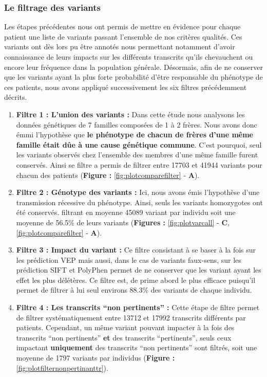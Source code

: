\documentclass[12pt,twoside]{reedthesis}
\theoremstyle{definition}
\theoremstyle{definition}
\theoremstyle{remark}
\begin{document}
  \subsubsection{Le filtrage des
  variants}\label{le-filtrage-des-variants-2}
  
  Les étapes précédentes nous ont permis de mettre en évidence pour chaque
  patient une liste de variants passant l'ensemble de nos critères
  qualités. Ces variants ont dès lors pu être annotés nous permettant
  notamment d'avoir connaissance de leurs impacts sur les différents
  transcrits qu'ils chevauchent ou encore leur fréquence dans la
  population générale. Désormais, afin de ne conserver que les variants
  ayant la plus forte probabilité d'être responsable du phénotype de ces
  patients, nous avons appliqué successivement les six filtres
  précédemment décrits.
  
  \begin{enumerate}
  \def\labelenumi{\arabic{enumi}.}
  \item
    \textbf{Filtre 1 : L'union des variants :} Dans cette étude nous
    analysons les données génétiques de 7 familles composées de 1 à 2
    frères. Nous avons donc émmi l'hypothèse que \textbf{le phénotype de
    chacun de frères d'une même famille était dûe à une cause génétique
    commune}. C'est pourquoi, seul les variants observés chez l'ensemble
    des membres d'une même famille furent conservés. Ainsi se filtre a
    permis de filtrer entre 17703 et 41944 variants pour chacun des
    patients (\textbf{Figure : }\ref{fig:plotcomparefilter} - \textbf{A}).
  \item
    \textbf{Filtre 2 : Génotype des variants :} Ici, nous avons émis
    l'hypothèse d'une transmission récessive du phénotype. Ainsi, seuls
    les variants homozygotes ont été conservés. filtrant en moyenne 45089
    variant par individu soit une moyenne de 56.5\% de leurs variants
    (\textbf{Figures : }\ref{fig:plotvarcall} - \textbf{C},
    \ref{fig:plotcomparefilter} - \textbf{A}).
  \item
    \textbf{Filtre 3 : Impact du variant :} Ce filtre consistant à se
    baser à la fois sur les prédiction VEP mais aussi, dans le cas de
    variants faux-sens, sur les prédiction SIFT et PolyPhen permet de ne
    conserver que les variant ayant les effet les plus délétères. Ce
    filtre est, de prime abord le plus efficace puisqu'il permet de
    filtrer à lui seul environs 88.3\% des variants de chaque individu.
  \item
    \textbf{Filtre 4 : Les transcrits ``non pertinents'' :} Cette étape de
    filtre permet de filtrer systématiquement entre 13712 et 17992
    transcrits différents par patients. Cependant, un même variant pouvant
    impacter à la fois des transcrits ``non pertinents'' \textbf{et} des
    transcrits ``pertinents'', seuls ceux impactant \textbf{uniquement}
    des transcrits ``non pertinents'' sont filtrés, soit une moyenne de
    1797 variants par individus (\textbf{Figure :
    }\ref{fig:plotfilternonpertinanttr}).
  \end{enumerate}
  
\end{document}

